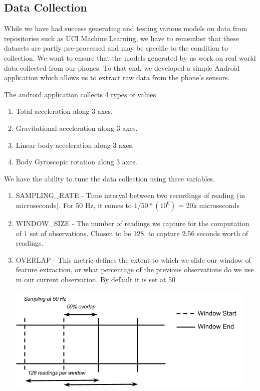 \documentclass{article} %
\begin{document}
\subsection{Data Collection}
While we have had success generating and testing various models on data from repositories such as UCI Machine Learning, we have to remember that these datasets are partly pre-processed and may be specific to the condition to collection. We want to ensure that the models generated by us work on real world data collected from our phones. To that end, we developed a simple Android application which allows us to extract raw data from the phone’s sensors.

The android application collects 4 types of values
\begin{enumerate}
\item Total acceleration along 3 axes.
\item Gravitational acceleration along 3 axes.
\item Linear body acceleration along 3 axes.
\item Body Gyroscopic rotation along 3 axes.
\end{enumerate}
We have the ability to tune the data collection using three variables.
\begin{enumerate}
	\item SAMPLING\_RATE - Time interval between two recordings of reading (in microseconds). For 50 Hz, it comes to
		$1 / 50 * ( 10 ^ 6 )$ = 20k microseconds
	\item WINDOW\_SIZE - The number of readings we capture for the computation of 1 set of observations. Chosen to be 128, to capture 2.56 seconds worth of readings.
	\item OVERLAP - This metric defines the extent to which we slide our window of feature extraction, or what percentage of the previous observations do we use in our current observation. By default it is set at 50%

\includegraphics[scale=0.5]{SamplingWindow}

\end{enumerate}
\end{document}
